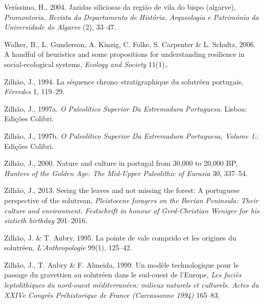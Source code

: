 \documentclass[12pt,twoside]{reedthesis}
\begin{document}
\leavevmode\hypertarget{ref-verissimo2004}{}%
Veríssimo, H., 2004. Jazidas siliciosas da região de vila do bispo (algarve), \emph{Promontoria, Revista do Departamento de História, Arqueologia e Património da Universidade do Algarve} (2), 33--47.

\leavevmode\hypertarget{ref-walker2006}{}%
Walker, B., L. Gunderson, A. Kinzig, C. Folke, S. Carpenter \& L. Schultz, 2006. A handful of heuristics and some propositions for understanding resilience in social-ecological systems, \emph{Ecology and Society} 11(1),.

\leavevmode\hypertarget{ref-zilhao1994}{}%
Zilhão, J., 1994. La séquence chrono--stratigraphique du solutréen portugais, \emph{Férvedes} 1, 119--29.

\leavevmode\hypertarget{ref-zilhao1997b}{}%
Zilhão, J., 1997a. \emph{O Paleolítico Superior Da Estremadura Portuguesa}. Lisboa: Edições Colibri.

\leavevmode\hypertarget{ref-zilhao1997}{}%
Zilhão, J., 1997b. \emph{O Paleolítico Superior Da Estremadura Portuguesa, Volume 1}.: Edições Colibri.

\leavevmode\hypertarget{ref-zilhao2000}{}%
Zilhão, J., 2000. Nature and culture in portugal from 30,000 to 20,000 BP, \emph{Hunters of the Golden Age: The Mid-Upper Paleolithic of Eurasia} 30, 337--54.

\leavevmode\hypertarget{ref-zilhao2013}{}%
Zilhão, J., 2013. Seeing the leaves and not missing the forest: A portuguese perspective of the solutrean, \emph{Pleistocene foragers on the Iberian Peninsula: Their culture and environment. Festschrift in honour of Gerd-Christian Weniger for his sixtieth birthday} 201--2016.

\leavevmode\hypertarget{ref-zilhaoetal1995}{}%
Zilhão, J. \& T. Aubry, 1995. La pointe de vale comprido et les origines du solutréen, \emph{L'Anthropologie} 99(1), 125--42.

\leavevmode\hypertarget{ref-zilhaoetal1999}{}%
Zilhão, J., T. Aubry \& F. Almeida, 1999. Un modèle technologique pour le passage du gravettien au solutréen dans le sud-ouest de l'Europe, \emph{Les faciès leptolithiques du nord-ouest méditerranéen: milieux naturels et culturels. Actes du XXIVe Congrès Préhistorique de France (Carcassonne 1994)} 165--83.

\appendix
\end{document}
